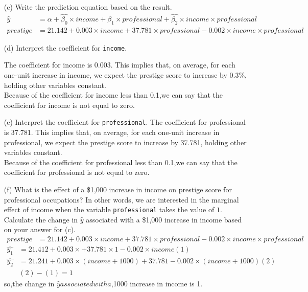 \documentclass[12pt,letterpaper]{article}
\begin{document}
\begin{enumerate}
		
			
	\vspace{6cm}
	\item [(c)]
	Write the prediction equation based on the result.
	\vspace{10mm}
	\begin{align*}
	\hat{y} &= \alpha+\hat{\beta_0}\times income+ \hat{\beta_1}\times professional+\hat{\beta_2}\times income\times professional\\
	prestige&= 21.142 + 0.003\times income + 37.781\times professional -0.002\times income\times professional
\end{align*}

	
\newpage
	\item [(d)]
	Interpret the coefficient for \texttt{income}.
	\vspace{10mm}
	
	The coefficient for income is 0.003. This implies that, on average, for each one-unit increase in income, we expect the prestige score to increase by 0.3\%,
	holding other variables constant.\\
	
	Because of the coefficient for income less than 0.1,we can say that the coefficient for income is not equal to zero.
	
	\vspace{10cm}	
	\item [(e)]
	Interpret the coefficient for \texttt{professional}.
	\vspace{10mm}
	The coefficient for professional is 37.781. This implies that, on average, for each one-unit increase in professional, we expect the prestige score to increase by 37.781, holding other variables constant.\\
	
	Because of the coefficient for professional less than 0.1,we can say that the coefficient for professional is not equal to zero.

	
	\newpage
	\item [(f)]
	What is the effect of a \$1,000 increase in income on prestige score for professional occupations? In other words, we are interested in the marginal effect of income when the variable \texttt{professional} takes the value of $1$. Calculate the change in $\hat{y}$ associated with a \$1,000 increase in income based on your answer for (c).
	\vspace{10mm}
	\begin{align*}
	prestige&= 21.142 + 0.003\times income + 37.781\times professional -0.002\times income\times professional      
\end{align*}
    \begin{align*}
	\hat{y_1}&=21.412+0.003\times+37.781\times1-0.002\times income  (1)\\
	\hat{y_2}&=21.241+0.003\times(income+1000)+37.781-0.002\times(income+1000)(2)\\
	&(2)-(1)=1	
\end{align*}
so,the change in $\hat y associated with a $,1000 increase in income is 1.
	\vspace{10cm}
	

\end{enumerate}
\end{document}
